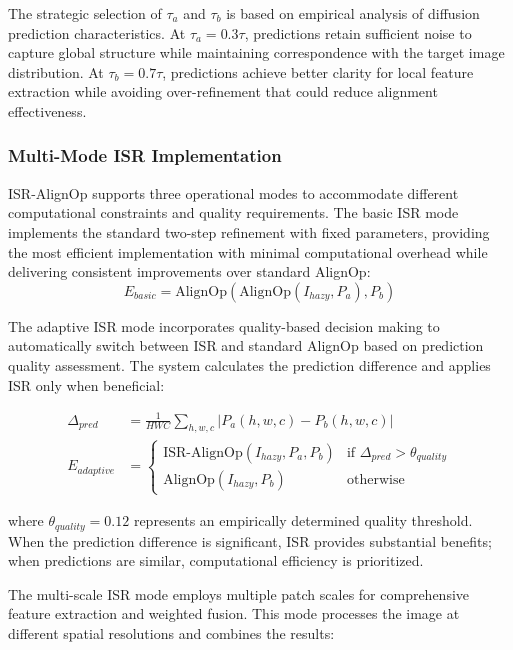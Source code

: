 \documentclass{article}
\begin{document}
The strategic selection of $\tau_a$ and $\tau_b$ is based on empirical analysis of diffusion prediction characteristics. At $\tau_a = 0.3\tau$, predictions retain sufficient noise to capture global structure while maintaining correspondence with the target image distribution. At $\tau_b = 0.7\tau$, predictions achieve better clarity for local feature extraction while avoiding over-refinement that could reduce alignment effectiveness.

\subsubsection{Multi-Mode ISR Implementation}

ISR-AlignOp supports three operational modes to accommodate different computational constraints and quality requirements. The basic ISR mode implements the standard two-step refinement with fixed parameters, providing the most efficient implementation with minimal computational overhead while delivering consistent improvements over standard AlignOp:
\begin{equation}
E_{basic} = \text{AlignOp}(\text{AlignOp}(I_{hazy}, P_a), P_b)
\end{equation}

The adaptive ISR mode incorporates quality-based decision making to automatically switch between ISR and standard AlignOp based on prediction quality assessment. The system calculates the prediction difference and applies ISR only when beneficial:

\begin{align}
\Delta_{pred} &= \frac{1}{HWC} \sum_{h,w,c} |P_a(h,w,c) - P_b(h,w,c)| \label{eq:pred_diff} \\
E_{adaptive} &= \begin{cases}
\text{ISR-AlignOp}(I_{hazy}, P_a, P_b) & \text{if } \Delta_{pred} > \theta_{quality} \\
\text{AlignOp}(I_{hazy}, P_b) & \text{otherwise}
\end{cases} \label{eq:adaptive_decision}
\end{align}

where $\theta_{quality} = 0.12$ represents an empirically determined quality threshold. When the prediction difference is significant, ISR provides substantial benefits; when predictions are similar, computational efficiency is prioritized.

The multi-scale ISR mode employs multiple patch scales for comprehensive feature extraction and weighted fusion. This mode processes the image at different spatial resolutions and combines the results:
\end{document}
